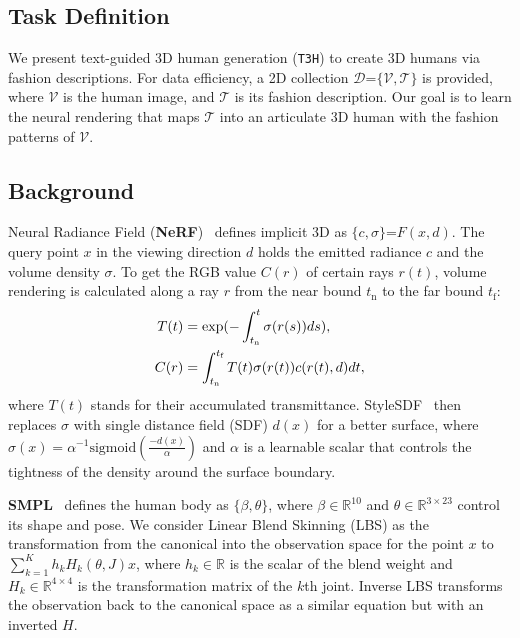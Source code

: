 \documentclass[11pt]{article}
\begin{document}
\subsection{Task Definition}
We present text-guided 3D human generation (\texttt{T3H}) to create 3D humans via fashion descriptions. For data efficiency, a 2D collection $\mathcal{D}$=$\{\mathcal{V}, \mathcal{T}\}$ is provided, where $\mathcal{V}$ is the human image, and $\mathcal{T}$ is its fashion description. Our goal is to learn the neural rendering that maps $\mathcal{T}$ into an articulate 3D human with the fashion patterns of $\mathcal{V}$.

\subsection{Background}
Neural Radiance Field (\textbf{NeRF})~\cite{mildenhall2020nerf} defines implicit 3D as $\{c, \sigma\}$=$F(x, d)$. The query point $x$ in the viewing direction $d$ holds the emitted radiance $c$ and the volume density $\sigma$. To get the RGB value $C(r)$ of certain rays $r(t)$, volume rendering is calculated along a ray $r$ from the near bound $t_\text{n}$ to the far bound $t_\text{f}$:
\begin{align}
    T(t) &= \exp(-\int_{t_\text{n}}^{t}\sigma(r(s))ds), \notag \\
    C(r) &= \int_{t_\text{n}}^{t_\text{f}}T(t)\sigma(r(t))c(r(t), d)dt, \label{eq:nerf}
\end{align}
where $T(t)$ stands for their accumulated transmittance. StyleSDF~\cite{or-ei2022style-sdf} then replaces $\sigma$ with single distance field (SDF) $d(x)$ for a better surface, where $\sigma(x)=\alpha^{-1}\text{sigmoid}(\frac{-d(x)}{\alpha})$ and $\alpha$ is a learnable scalar that controls the tightness of the density around the surface boundary.

\vspace{1ex} \noindent \textbf{SMPL}~\cite{bogo2016smpl} defines the human body as $\{\beta, \theta\}$, where $\beta \in \mathbb{R}^{10}$ and $\theta \in \mathbb{R}^{3 \times 23}$ control its shape and pose. We consider Linear Blend Skinning (LBS) as the transformation from the canonical into the observation space for the point $x$ to $\sum_{k=1}^{K}h_{k}H_k(\theta, J)x$, where $h_k \in \mathbb{R}$ is the scalar of the blend weight and $H_k \in \mathbb{R}^{4 \times 4}$ is the transformation matrix of the $k$th joint. Inverse LBS transforms the observation back to the canonical space as a similar equation but with an inverted $H$.
\end{document}
